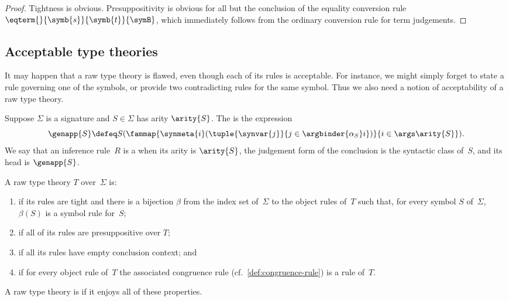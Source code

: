 \begin{proof}
  Tightness is obvious. Presuppositivity is obvious for all but the conclusion of the equality conversion rule $\eqterm{}{\symb{s}}{\symb{t}}{\symB}$, which immediately follows from the ordinary conversion rule for term judgements.
\end{proof}


\subsection{Acceptable type theories}
\label{sec:acceptable-type-theories}

It may happen that a raw type theory is flawed, even though each of its rules is acceptable. For instance, we might simply forget to state a rule governing one of the symbols, or provide two contradicting rules for the same symbol. Thus we also need a notion of acceptability of a raw type theory.

\begin{definition}%
  \label{def:symbol-rule}%
  Suppose $\Sigma$ is a signature and $S \in \Sigma$ has arity $\arity{S}$.
  The  is the expression
  \begin{equation*}
     \genapp{S} \defeq
     S(\fammap
         {\synmeta{i}(\tuple{\synvar{j}}{j \in \argbinder {\alpha_S} i})}
         {i \in \args \arity{S}}
     ).
  \end{equation*}
  We say that an inference rule~$R$ is a  when its arity is $\arity{S}$, the judgement form of the conclusion is the syntactic class of~$S$, and its head is $\genapp{S}$.
\end{definition}

\begin{definition}
  \label{def:theory-good-properties}%
  A raw type theory $T$ over~$\Sigma$ is:
  \begin{enumerate}
  \item {} if its rules are tight and there is a bijection $\beta$ from the index set of~$\Sigma$ to the object rules of~$T$ such that, for every symbol $S$ of~$\Sigma$, $\beta(S)$ is a symbol rule for~$S$;
  \item {} if all of its rules are presuppositive over $T$;
  \item {} if all its rules have empty conclusion context; and
  \item {} if for every object rule of~$T$ the associated congruence rule (cf.~\cref{def:congruence-rule}) is a rule of~$T$.
  \end{enumerate}
  A raw type theory is  if it enjoys all of these properties.
\end{definition}

